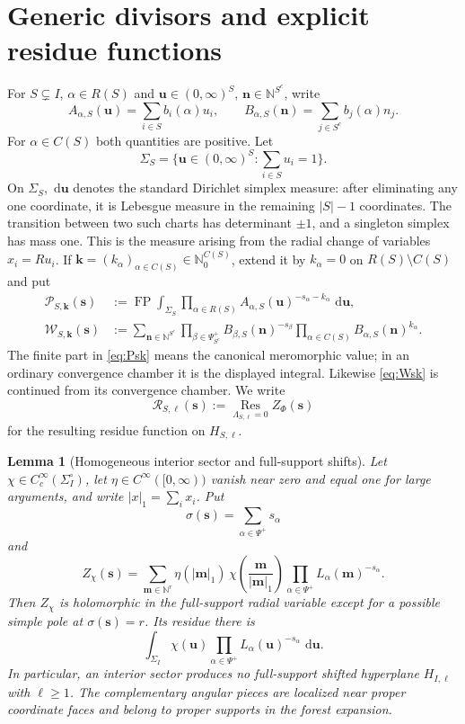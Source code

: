 \documentclass[11pt]{article}
\newtheorem{lemma}[theorem]{Lemma}
\newcommand{\N}{\mathbb N}
\newcommand{\Nzero}{\mathbb N_0}
\newcommand{\Res}{\operatorname*{Res}}
\newcommand{\FP}{\operatorname*{FP}}
\newcommand{\dd}{\,\mathrm d}
\newcommand{\cR}{\mathcal R}
\newcommand{\cP}{\mathcal P}
\newcommand{\cW}{\mathcal W}
\begin{document}
\section{Generic divisors and explicit residue functions}

For $S\subsetneq I$, $\alpha\in R(S)$ and
$\mathbf u\in(0,\infty)^S$, $\mathbf n\in\N^{S^c}$, write
\[
 A_{\alpha,S}(\mathbf u)=\sum_{i\in S}b_i(\alpha)u_i,
 \qquad
 B_{\alpha,S}(\mathbf n)=\sum_{j\in S^c}b_j(\alpha)n_j.
\]
For $\alpha\in C(S)$ both quantities are positive.  Let
\[
 \Sigma_S=\{\mathbf u\in(0,\infty)^S:\sum_{i\in S}u_i=1\}.
\]
On \(\Sigma_S\), \(\dd\mathbf u\) denotes the standard Dirichlet
simplex measure: after eliminating any one coordinate, it is Lebesgue
measure in the remaining \(|S|-1\) coordinates.  The transition between
two such charts has determinant \(\pm1\), and a singleton simplex has
mass one.  This is the measure arising from the radial change of
variables \(x_i=R u_i\).
If $\mathbf k=(k_\alpha)_{\alpha\in C(S)}\in\Nzero^{C(S)}$, extend it
by $k_\alpha=0$ on $R(S)\setminus C(S)$ and put
\begin{align}
 \cP_{S,\mathbf k}(\mathbf s)
 &:=\FP\int_{\Sigma_S}
      \prod_{\alpha\in R(S)}
      A_{\alpha,S}(\mathbf u)^{-s_\alpha-k_\alpha}\,\dd\mathbf u,
      \label{eq:Psk}\\
 \cW_{S,\mathbf k}(\mathbf s)
 &:=\sum_{\mathbf n\in\N^{S^c}}
      \prod_{\beta\in\Psi^+_{S^c}}
      B_{\beta,S}(\mathbf n)^{-s_\beta}
      \prod_{\alpha\in C(S)}
      B_{\alpha,S}(\mathbf n)^{k_\alpha}.
      \label{eq:Wsk}
\end{align}
The finite part in \eqref{eq:Psk} means the canonical meromorphic value;
in an ordinary convergence chamber it is the displayed integral.
Likewise \eqref{eq:Wsk} is continued from its convergence chamber.  We
write
\[
 \cR_{S,\ell}(\mathbf s)
 :=\Res_{\Lambda_{S,\ell}=0}Z_\Phi(\mathbf s)
\]
for the resulting residue function on \(H_{S,\ell}\).

\begin{lemma}[Homogeneous interior sector and full-support shifts]
\label{lem:interior-sector}
Let \(\chi\in C_c^\infty(\Sigma_I^\circ)\), let
\(\eta\in C^\infty([0,\infty))\) vanish near zero and equal one for
large arguments, and write \(|x|_1=\sum_i x_i\).  Put
\[
 \sigma(\mathbf s)=\sum_{\alpha\in\Psi^+}s_\alpha
\]
and
\[
 Z_\chi(\mathbf s)=
 \sum_{\mathbf m\in\N^r}
 \eta(|\mathbf m|_1)\,
 \chi\!\left(\frac{\mathbf m}{|\mathbf m|_1}\right)
 \prod_{\alpha\in\Psi^+}L_\alpha(\mathbf m)^{-s_\alpha}.
\]
Then \(Z_\chi\) is holomorphic in the full-support radial variable
except for a possible simple pole at \(\sigma(\mathbf s)=r\).  Its
residue there is
\[
 \int_{\Sigma_I}
 \chi(\mathbf u)
 \prod_{\alpha\in\Psi^+}L_\alpha(\mathbf u)^{-s_\alpha}
 \,\dd\mathbf u.
\]
In particular, an interior sector produces no full-support shifted
hyperplane \(H_{I,\ell}\) with \(\ell\geq1\).  The complementary angular
pieces are localized near proper coordinate faces and belong to proper
supports in the forest expansion.
\end{lemma}
\end{document}
